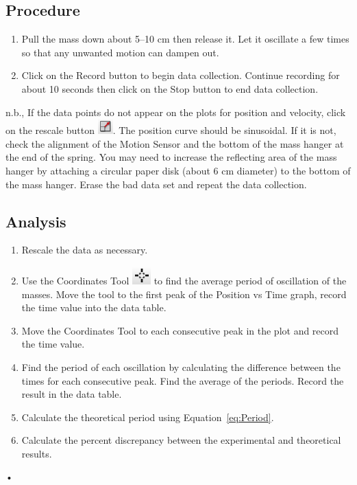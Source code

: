 \documentclass[main.tex]{subfiles}
\begin{document}
\subsection*{Procedure}
\begin{enumerate}
\item
Pull the mass down about 5--10 cm then release it. Let it oscillate a few times so that any unwanted motion can dampen out.
\item
Click on the Record button to begin data collection. Continue recording for about 10 seconds then click on the Stop button to end data collection.
\end{enumerate}
n.b., If the data points do not appear on the plots for position and velocity, click on the rescale button \includegraphics{Rescale}. The position curve should be sinusoidal. If it is not, check the alignment of the Motion Sensor and the bottom of the mass hanger at the end of the spring. You may need to increase the reflecting area of the mass hanger by attaching a circular paper disk (about 6 cm diameter) to the bottom of the mass hanger. Erase the bad data set and repeat the data collection.

\subsection*{Analysis}
\begin{enumerate}
\item
Rescale the data as necessary.
\item
Use the Coordinates Tool \includegraphics{Coordinates_Tool} to find the average period of oscillation of the masses. Move the tool to the first peak of the Position vs Time graph, record the time value into the data table.
\item
Move the Coordinates Tool to each consecutive peak in the plot and record the time value.
\item
Find the period of each oscillation by calculating the difference between the times for each consecutive peak. Find the average of the periods. Record the result in the data table.
\item
Calculate the theoretical period using Equation~\eqref{eq:Period}.
\item
Calculate the percent discrepancy between the experimental and theoretical results.
\end{enumerate}•
\end{document}
